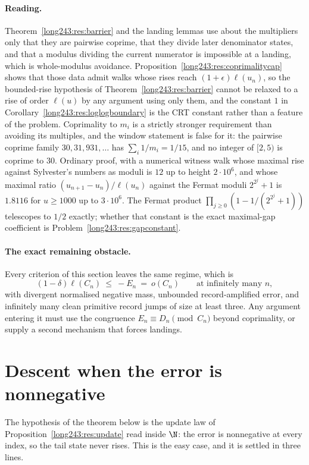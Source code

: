 \paragraph{Reading.}
Theorem~\ref{long243:res:barrier} and the landing lemmas use about the multipliers only
that they are pairwise coprime, that they divide later denominator states, and
that a modulus dividing the current numerator is impossible at a landing, which
is whole-modulus avoidance.  Proposition~\ref{long243:res:coprimalitycap} shows that
those data admit walks whose rises reach $(1+\epsilon)\ell(u_n)$, so the
bounded-rise hypothesis of Theorem~\ref{long243:res:barrier} cannot be relaxed to a
rise of order $\ell(u)$ by any argument using only them, and the constant $1$
in Corollary~\ref{long243:res:loglogboundary} is the CRT constant rather than a feature
of the problem.  Coprimality to $m_i$ is a strictly stronger requirement than
avoiding its multiples, and the window statement is false for it: the pairwise
coprime family $30,31,931,\ldots$ has $\sum_i1/m_i=1/15$, and no integer of
$[2,5)$ is coprime to $30$.  Ordinary proof, with a numerical witness walk
whose maximal rise against Sylvester's numbers as moduli is $12$ up to height
$2\cdot10^6$, and whose maximal ratio $(u_{n+1}-u_n)/\ell(u_n)$ against the
Fermat moduli $2^{2^j}+1$ is $1.8116$ for $u\ge1000$ up to $3\cdot10^6$.  The
Fermat product $\prod_{j\ge0}(1-1/(2^{2^j}+1))$ telescopes to $1/2$ exactly;
whether that constant is the exact maximal-gap coefficient is
Problem~\ref{long243:res:gapconstant}.

\paragraph{The exact remaining obstacle.}
Every criterion of this section leaves the same regime, which is
\[
 (1-\delta)\ell(C_n)\ \le\ -E_n\ =\ o(C_n)
 \qquad\text{at infinitely many }n,
\]
with divergent normalised negative mass, unbounded record-amplified error, and
infinitely many clean primitive record jumps of size at least three.  Any
argument entering it must use the congruence $E_n\equiv D_n\pmod{C_n}$ beyond
coprimality, or supply a second mechanism that forces landings.

\section{Descent when the error is nonnegative}\label{long243:sec:descent}

The hypothesis of the theorem below is the update law of
Proposition~\ref{long243:res:update} read inside $\N$: the error is nonnegative at
every index, so the tail state never rises.  This is the easy case, and it is
settled in three lines.

